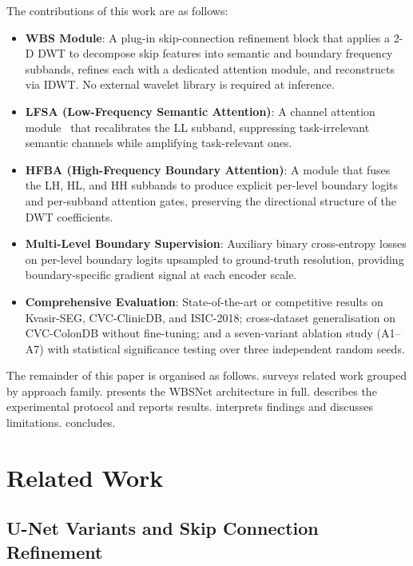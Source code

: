 \documentclass[journal]{IEEEtran}
\begin{document}
The contributions of this work are as follows:
\begin{itemize}
  \item \textbf{WBS Module}: A plug-in skip-connection refinement block that
    applies a 2-D DWT to decompose skip features into semantic and boundary
    frequency subbands, refines each with a dedicated attention module, and
    reconstructs via IDWT.
    No external wavelet library is required at inference.
  \item \textbf{LFSA (Low-Frequency Semantic Attention)}: A channel attention
    module~\cite{hu2018senet} that recalibrates the LL subband, suppressing
    task-irrelevant semantic channels while amplifying task-relevant ones.
  \item \textbf{HFBA (High-Frequency Boundary Attention)}: A module that fuses
    the LH, HL, and HH subbands to produce explicit per-level boundary logits
    and per-subband attention gates, preserving the directional structure of
    the DWT coefficients.
  \item \textbf{Multi-Level Boundary Supervision}: Auxiliary binary
    cross-entropy losses on per-level boundary logits upsampled to
    ground-truth resolution, providing boundary-specific gradient signal at
    each encoder scale.
  \item \textbf{Comprehensive Evaluation}: State-of-the-art or competitive
    results on Kvasir-SEG, CVC-ClinicDB, and ISIC-2018; cross-dataset
    generalisation on CVC-ColonDB without fine-tuning; and a seven-variant
    ablation study (A1--A7) with statistical significance testing over three
    independent random seeds.
\end{itemize}

The remainder of this paper is organised as follows.
 surveys related work grouped by approach family.
 presents the WBSNet architecture in full.
 describes the experimental protocol and reports results.
 interprets findings and discusses limitations.
 concludes.


\section{Related Work}\label{sec:related}

\subsection{U-Net Variants and Skip Connection Refinement}
\end{document}

